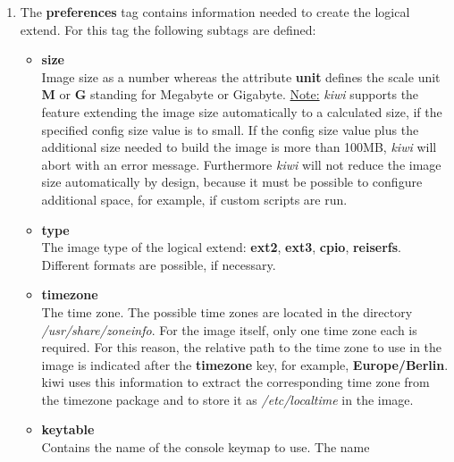 \begin{itemize}
      \begin{enumerate}
          \item The \textbf{preferences} tag contains information needed to
          create the logical extend. For this tag the following subtags
          are defined:
          \begin{itemize}
              \item \textbf{size}\\
                    Image size as a number whereas the attribute
                    \textbf{unit} defines the scale unit \textbf{M} or
                    \textbf{G} standing for Megabyte or Gigabyte.
                    \underline{Note:}
                    \textit{kiwi} supports the feature extending the image size
                    automatically to a calculated size, if the specified
                    config size value is to small. If the config size value
                    plus the additional size needed to build the image is more
                    than 100MB, \textit{kiwi} will abort with an error message.
                    Furthermore \textit{kiwi} will not reduce the image size
                    automatically by design, because it must be possible to
                    configure additional space, for example, if custom scripts
                    are run.
              \item \textbf{type}\\
                    The image type of the logical extend: \textbf{ext2},
                    \textbf{ext3}, \textbf{cpio}, \textbf{reiserfs}.
                    Different formats are possible, if necessary.
              \item \textbf{timezone}\\
                    The time zone. The possible time zones are located in the
                    directory \textit{/usr/share/zoneinfo}. For the image
                    itself, only one time zone each is required. For this
                    reason, the relative path to the time zone to use in the
                    image is indicated after the \textbf{timezone} key, for
                    example, \textbf{Europe/Berlin}. kiwi uses this information
                    to extract the corresponding time zone from the timezone
                    package and to store it as \textit{/etc/localtime} in the
                    image.
              \item \textbf{keytable}\\
                    Contains the name of the console keymap to use. The name

\end{itemize}
\end{enumerate}
\end{itemize}
